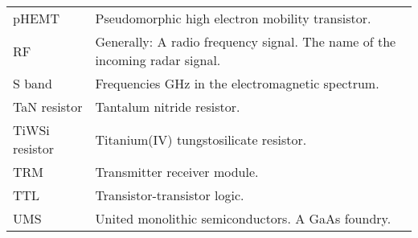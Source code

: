 \begin{tabular}{ l l }
		pHEMT & Pseudomorphic high electron mobility transistor. \\
		RF & Generally: A radio frequency signal. The name of the incoming radar signal. \\
		S band & Frequencies \unit[2--4]{GHz} in the electromagnetic spectrum. \\
		TaN resistor & Tantalum nitride resistor. \\
		TiWSi resistor & Titanium(IV) tungstosilicate resistor. \\
		TRM & Transmitter receiver module. \\
		TTL & Transistor-transistor logic. \\
		UMS & United monolithic semiconductors. A GaAs foundry. \\
	\end{tabular}
